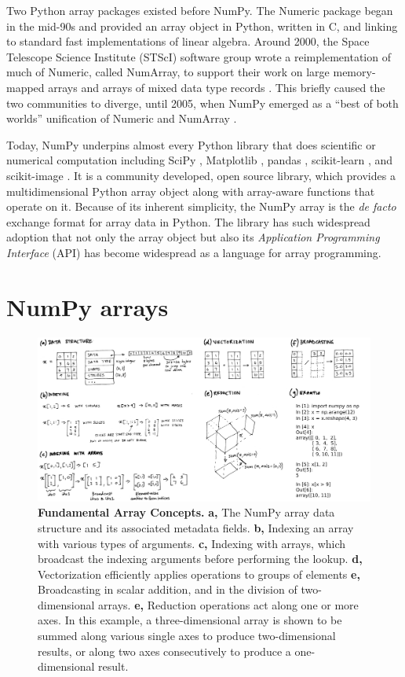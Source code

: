 Two Python array packages existed before NumPy.
The Numeric package began in the mid-90s and provided an array object in
Python, written in C, and linking to standard fast implementations of linear
algebra.
Around 2000, the Space Telescope Science Institute (STScI) software group wrote
a reimplementation of much of Numeric, called NumArray, to support their work
on large memory-mapped arrays and arrays of mixed data type
records \cite{STScI-slither}.
This briefly caused the two communities to diverge, until
2005, when NumPy emerged as a ``best of both worlds'' unification of Numeric
and NumArray \cite{oliphant2006guide}.

Today, NumPy underpins almost every Python library that does scientific or
numerical computation including SciPy \cite{virtanen2019scipy},
Matplotlib \cite{hunter2007matplotlib}, pandas \cite{mckinney-proc-scipy-2010},
scikit-learn \cite{pedregosa2011scikit}, and
scikit-image \cite{vanderwalt2014scikit}.
It is a community developed, open source library, which provides a
multidimensional Python array object along with array-aware functions
that operate on it.
Because of its inherent simplicity, the NumPy array is
the {\it de facto} exchange format for array data in Python.
The library has such widespread adoption that not only the array object but also its
{\it Application Programming Interface} (API) has become widespread as
a language for array programming.

\section*{NumPy arrays}

\begin{figure}
  \centering
  \includegraphics[width=\textwidth]{static/sketches/array-concepts}   
  \caption{\textbf{Fundamental Array Concepts.}
    \textbf{a,} The NumPy array data structure and its associated metadata fields.
    \textbf{b,} Indexing an array with various types of arguments.
    \textbf{c,} Indexing with arrays, which broadcast the indexing arguments before performing the lookup.
    \textbf{d,} Vectorization efficiently applies operations to groups of elements
    \textbf{e,} Broadcasting in scalar addition, and in the division of two-dimensional arrays.
    \textbf{e,} Reduction operations act along one or more axes. In this
    example, a three-dimensional array is shown to be summed along various single
    axes to produce two-dimensional results, or along two axes consecutively to
    produce a one-dimensional result.
   }
  \label{fig:array-concepts}
\end{figure}

